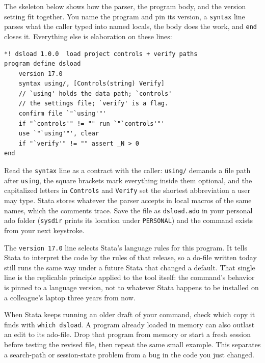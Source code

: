 The skeleton below shows how the parser, the program body, and the version setting fit together. You name the program and pin its version, a \texttt{syntax} line parses what the caller typed into named locals, the body does the work, and \texttt{end} closes it. Everything else is elaboration on these lines:
\par
{\footnotesize
\begin{verbatim}
*! dsload 1.0.0  load project controls + verify paths
program define dsload
    version 17.0
    syntax using/, [Controls(string) Verify]
    // `using' holds the data path; `controls'
    // the settings file; `verify' is a flag.
    confirm file `"`using'"'
    if "`controls'" != "" run `"`controls'"'
    use `"`using'"', clear
    if "`verify'" != "" assert _N > 0
end
\end{verbatim}
}
Read the \texttt{syntax} line as a contract with the caller: \texttt{using/} demands a file path after \texttt{using}, the square brackets mark everything inside them optional, and the capitalized letters in \texttt{Controls} and \texttt{Verify} set the shortest abbreviation a user may type. Stata stores whatever the parser accepts in local macros of the same names, which the comments trace. Save the file as \texttt{dsload.ado} in your personal ado folder (\texttt{sysdir} prints its location under \texttt{PERSONAL}) and the command exists from your next keystroke.

The \texttt{version 17.0} line selects Stata's language rules for this program. It tells Stata to interpret the code by the rules of that release, so a do-file written today still runs the same way under a future Stata that changed a default. That single line is the replicable principle applied to the tool itself: the command's behavior is pinned to a language version, not to whatever Stata happens to be installed on a colleague's laptop three years from now.

When Stata keeps running an older draft of your command, check which copy it finds with \texttt{which dsload}. A program already loaded in memory can also outlast an edit to its ado-file. Drop that program from memory or start a fresh session before testing the revised file, then repeat the same small example. This separates a search-path or session-state problem from a bug in the code you just changed.

